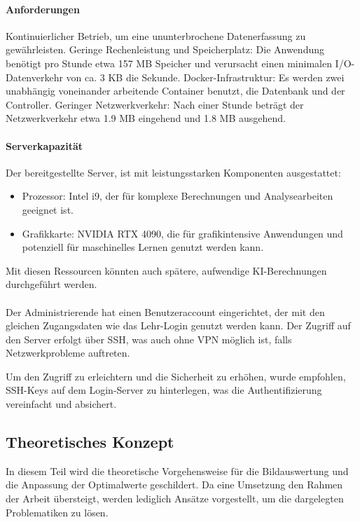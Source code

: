 \paragraph{Anforderungen}
Kontinuierlicher Betrieb, um eine ununterbrochene Datenerfassung zu gewährleisten.
Geringe Rechenleistung und Speicherplatz: Die Anwendung benötigt pro Stunde etwa 157 MB Speicher und verursacht einen minimalen I/O-Datenverkehr von ca. 3 KB die Sekunde.
Docker-Infrastruktur: Es werden zwei unabhängig voneinander arbeitende Container benutzt, die Datenbank und der Controller.
Geringer Netzwerkverkehr: Nach einer Stunde beträgt der Netzwerkverkehr etwa 1.9 MB eingehend und 1.8 MB ausgehend.

\paragraph{Serverkapazität}
Der bereitgestellte Server, ist mit leistungsstarken Komponenten ausgestattet:
\begin{itemize}
    \item Prozessor: Intel i9, der für komplexe Berechnungen und Analysearbeiten geeignet ist.
    \item Grafikkarte: NVIDIA RTX 4090, die für grafikintensive Anwendungen und potenziell für maschinelles Lernen genutzt werden kann.
\end{itemize}
Mit diesen Ressourcen könnten auch spätere, aufwendige KI-Berechnungen durchgeführt werden.

\paragraph{}
Der Administrierende hat einen Benutzeraccount eingerichtet, der mit den gleichen Zugangsdaten wie das Lehr-Login genutzt werden kann. Der Zugriff auf den Server erfolgt über SSH, was auch ohne VPN möglich ist, falls Netzwerkprobleme auftreten.

Um den Zugriff zu erleichtern und die Sicherheit zu erhöhen, wurde empfohlen, SSH-Keys auf dem Login-Server zu hinterlegen, was die Authentifizierung vereinfacht und absichert.

\subsection{Theoretisches Konzept}
In diesem Teil wird die theoretische Vorgehensweise für die Bildauswertung und die Anpassung der Optimalwerte geschildert. Da eine Umsetzung den Rahmen der Arbeit übersteigt, werden lediglich Ansätze vorgestellt, um die dargelegten Problematiken zu lösen.


